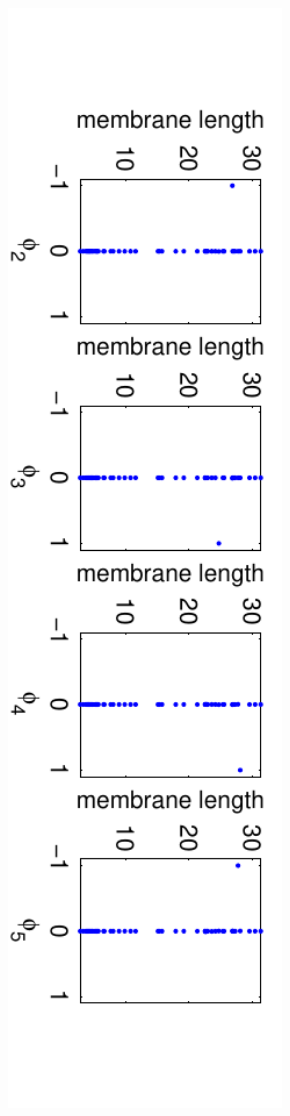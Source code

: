\documentclass{pnastwo}
\begin{document}
\begin{figure}[t]
\includegraphics[width=16cm, trim=2cm 0cm 2cm 0cm, clip]{FBsPCA_dmaps}

\end{figure}
\end{document}
